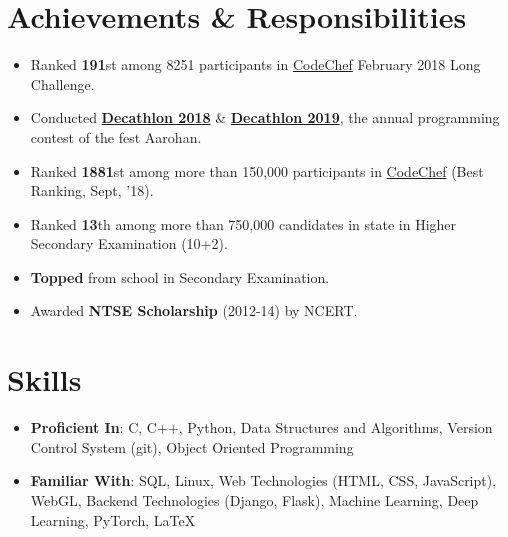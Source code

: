 \documentclass[letterpaper,11pt]{article}
\newcommand{\resumeSubHeadingListStart}{\begin{itemize}[leftmargin=*]}
\newcommand{\resumeSubHeadingListEnd}{\end{itemize}}
\newcommand{\resumeItemListStart}{\begin{itemize}}
\newcommand{\resumeItemListEnd}{\end{itemize}\vspace{-5pt}}
\begin{document}
\section{Achievements \& Responsibilities}
    \resumeItemListStart
     \setlength{\itemsep}{0.5pt}
      \item
        {Ranked \textbf{191}st among 8251 participants in \href{https://www.codechef.com/rankings/FEB18?filterBy=Institution\%3DNational\%20Institute\%20of\%20Technology\%2C\%20Durgapur&order=asc&sortBy=rank}{CodeChef} February 2018 Long Challenge.}
      \item
        {Conducted \href{http://hackerrank.com/dec18}{\textbf{Decathlon 2018}} \& {\href{https://www.hackerrank.com/decathlon19}{\textbf{Decathlon 2019}}}, the annual programming contest of the fest Aarohan.}
      \item
        {Ranked \textbf{1881}st among more than 150,000 participants in \href{https://codechef.com/users/ayan_nitd}{CodeChef} (Best Ranking, Sept, '18).}
      \item
        {Ranked \textbf{13}th among more than 750,000 candidates in state in Higher Secondary Examination
        (10+2).}
      \item
        {\textbf{Topped} from school in Secondary Examination.}
      \item
        {Awarded \textbf{NTSE Scholarship} (2012-14) by NCERT.}
    \resumeItemListEnd

\section{Skills}
 \resumeSubHeadingListStart
    \setlength{\itemsep}{1pt}
     \item\textbf{Proficient In}{: C, C++, Python, Data Structures and Algorithms, Version Control System (git), Object Oriented Programming}\\
     \item\textbf{Familiar With}{: SQL, Linux, Web Technologies (HTML, CSS, JavaScript), WebGL, Backend Technologies (Django, Flask), Machine Learning, Deep Learning, PyTorch, \LaTeX}
 \resumeSubHeadingListEnd
 
\end{document}

